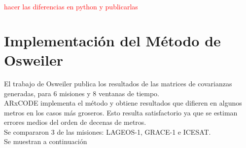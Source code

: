 \begin{table}[!h]
\centering
{}
\caption{Resultados del Systems Tool Kit (STK) propagando el mismo TLE que ARxCODE.}
\end{table}


\textcolor{red}{hacer las diferencias en python y publicarlas}

\section{Implementaci\'on del M\'etodo de Osweiler}

El trabajo de Osweiler publica los resultados de las matrices de covarianzas generadas, para 6 misiones y 8 ventanas de tiempo.\\
ARxCODE implementa el m\'etodo y obtiene resultados que difieren en algunos metros en los casos m\'as groseros. Esto resulta satisfactorio ya que se estiman errores medios del orden de decenas de metros.\\
Se compararon 3 de las misiones: LAGEOS-1, GRACE-1 e ICESAT.\\
Se muestran a continuaci\'on


